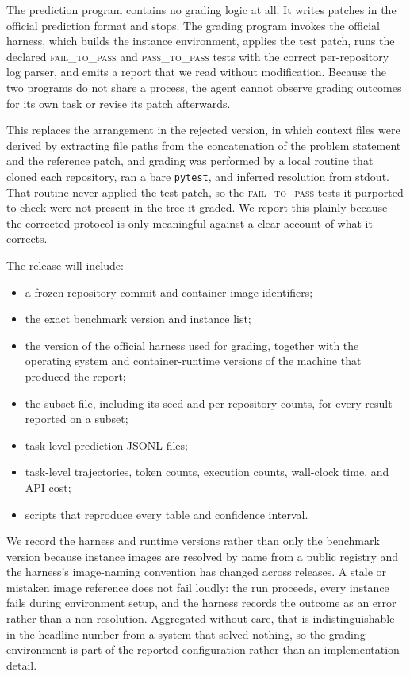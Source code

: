 \documentclass[journal]{IEEEtran}
\begin{document}
The prediction program contains no grading logic at all. It writes patches in the official prediction format and stops. The grading program invokes the official harness, which builds the instance environment, applies the test patch, runs the declared \textsc{fail\_to\_pass} and \textsc{pass\_to\_pass} tests with the correct per-repository log parser, and emits a report that we read without modification. Because the two programs do not share a process, the agent cannot observe grading outcomes for its own task or revise its patch afterwards.

This replaces the arrangement in the rejected version, in which context files were derived by extracting file paths from the concatenation of the problem statement and the reference patch, and grading was performed by a local routine that cloned each repository, ran a bare \texttt{pytest}, and inferred resolution from stdout. That routine never applied the test patch, so the \textsc{fail\_to\_pass} tests it purported to check were not present in the tree it graded. We report this plainly because the corrected protocol is only meaningful against a clear account of what it corrects.

The release will include:
\begin{itemize}
    \item a frozen repository commit and container image identifiers;
    \item the exact benchmark version and instance list;
    \item the version of the official harness used for grading, together with the operating system and container-runtime versions of the machine that produced the report;
    \item the subset file, including its seed and per-repository counts, for every result reported on a subset;
    \item task-level prediction JSONL files;
    \item task-level trajectories, token counts, execution counts, wall-clock time, and API cost;
    \item scripts that reproduce every table and confidence interval.
\end{itemize}

We record the harness and runtime versions rather than only the benchmark version because instance images are resolved by name from a public registry and the harness's image-naming convention has changed across releases. A stale or mistaken image reference does not fail loudly: the run proceeds, every instance fails during environment setup, and the harness records the outcome as an error rather than a non-resolution. Aggregated without care, that is indistinguishable in the headline number from a system that solved nothing, so the grading environment is part of the reported configuration rather than an implementation detail.
\end{document}
